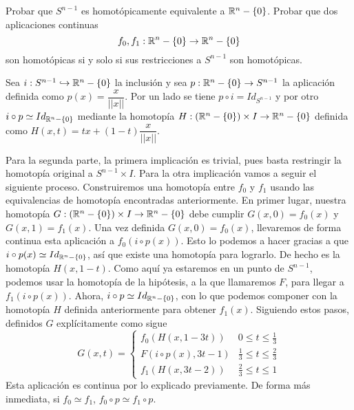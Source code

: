 \documentclass[twoside]{article}
\begin{document}
\begin{ejercicio}{6.5}
Probar que $S^{n-1}$ es homotópicamente equivalente a $\mathbb{R}^n-\{0\}$. Probar que dos aplicaciones continuas
\[
f_0,f_1:\mathbb{R}^n-\{0\}\to\mathbb{R}^n-\{0\}
\]
son homotópicas si y solo si sus restricciones a $S^{n-1}$ son homotópicas.
\end{ejercicio}
\begin{solucion}
Sea $i:S^{n-1}\hookrightarrow \mathbb{R}^n-\{0\}$ la inclusión y sea $p:\mathbb{R}^n-\{0\}\to S^{n-1}$ la aplicación definida como $p(x)=\dfrac{x}{||x||}$. Por un lado se tiene $p\circ i=Id_{S^{n-1}}$ y por otro $i\circ p\simeq Id_{\mathbb{R}^n-\{0\}}$ mediante la homotopía $H:(\mathbb{R}^n-\{0\})\times I\to \mathbb{R}^n-\{0\}$ definida como $H(x,t)=tx+(1-t)\dfrac{x}{||x||}$. 

Para la segunda parte, la primera implicación es trivial, pues basta restringir la homotopía original a $S^{n-1}\times I$. Para la otra implicación vamos a seguir el siguiente proceso. Construiremos una homotopía entre $f_0$ y $f_1$ usando las equivalencias de homotopía encontradas anteriormente. En primer lugar, nuestra homotopía $G:(\mathbb{R}^n-\{0\})\times I\to \mathbb{R}^n-\{0\}$ debe cumplir $G(x,0)=f_0(x)$ y $G(x,1)=f_1(x)$. Una vez definida $G(x,0)=f_0(x)$, llevaremos de forma continua esta aplicación a $f_0(i\circ p(x))$.  Esto lo podemos a hacer gracias a que $i\circ p(x)\simeq Id_{\mathbb{R}^n-\{0\}}$, así que existe una homotopía para lograrlo. De hecho es la homotopía $H(x,1-t)$. Como aquí ya estaremos en un punto de $S^{n-1}$, podemos usar la homotopía de la hipótesis, a la que llamaremos $F$, para llegar a $f_1(i\circ p(x))$. Ahora, $i\circ p \simeq Id_{\mathbb{R}^n-\{0\}}$, con lo que podemos componer con la homotopía $H$ definida anteriormente para obtener $f_1(x)$. Siguiendo estos pasos, definidos $G$ explícitamente como sigue
\[
G(x,t)=\begin{cases}
f_0(H(x,1-3t)) & 0\leq t\leq \frac{1}{3}\\
F(i\circ p(x), 3t-1) & \frac{1}{3}\leq t\leq\frac{2}{3}\\
f_1(H(x, 3t-2)) & \frac{2}{3}\leq t\leq 1
\end{cases}
\]
Esta aplicación es continua por lo explicado previamente. De forma más inmediata, si $f_0 \simeq f_1$, $f_0\circ p\simeq f_1\circ p$. 
\end{solucion}

\newpage
\end{document}
